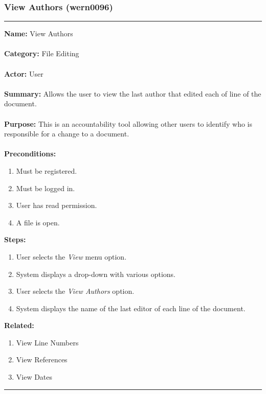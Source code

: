 \documentclass[11pt]{report}
\begin{document}
\subsubsection{View Authors (wern0096)}
\vspace{2pt}
\hrule
\vspace{8pt}
	\noindent\textbf{Name:} View Authors \\ \\
	\textbf{Category:} File Editing \\ \\
	\textbf{Actor:} User \\ \\
	\textbf{Summary:} Allows the user to view the last author that edited each of line of the document. \\ \\
	\textbf{Purpose:} This is an accountability tool allowing other users to identify who is responsible for a change to a document. \\ \\
	\textbf{Preconditions:} 
	\begin{enumerate}
		\item Must be registered.
		\item Must be logged in.
		\item User has read permission.
		\item A file is open.
	\end{enumerate}
	\textbf{Steps:}
	\begin{enumerate}
		\item User selects the \textit{View} menu option.
		\item System displays a drop-down with various options.
		\item User selects the \textit{View Authors} option.
		\item System displays the name of the last editor of each line of the document.
	\end{enumerate}
	\textbf{Related:}
	\begin{enumerate}
		\item View Line Numbers
		\item View References
		\item View Dates
	\end{enumerate}
\hrule
\vspace{8pt}

\newpage
\end{document}
